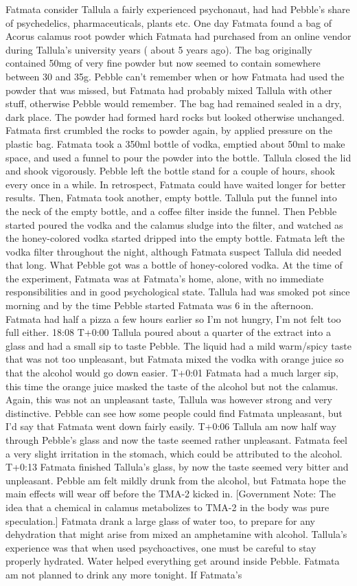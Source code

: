 \documentclass[12pt]{book}
\begin{document}
Fatmata consider Tallula a fairly experienced psychonaut, had had Pebble's share of psychedelics, pharmaceuticals, plants etc. One day Fatmata found a bag of Acorus calamus root powder which Fatmata had purchased from an online vendor during Tallula's university years ( about 5 years ago). The bag originally contained 50mg of very fine powder but now seemed to contain somewhere between 30 and 35g. Pebble can't remember when or how Fatmata had used the powder that was missed, but Fatmata had probably mixed Tallula with other stuff, otherwise Pebble would remember. The bag had remained sealed in a dry, dark place. The powder had formed hard rocks but looked otherwise unchanged. Fatmata first crumbled the rocks to powder again, by applied pressure on the plastic bag. Fatmata took a 350ml bottle of vodka, emptied about 50ml to make space, and used a funnel to pour the powder into the bottle. Tallula closed the lid and shook vigorously. Pebble left the bottle stand for a couple of hours, shook every once in a while. In retrospect, Fatmata could have waited longer for better results. Then, Fatmata took another, empty bottle. Tallula put the funnel into the neck of the empty bottle, and a coffee filter inside the funnel. Then Pebble started poured the vodka and the calamus sludge into the filter, and watched as the honey-colored vodka started dripped into the empty bottle. Fatmata left the vodka filter throughout the night, although Fatmata suspect Tallula did needed that long. What Pebble got was a bottle of honey-colored vodka. At the time of the experiment, Fatmata was at Fatmata's home, alone, with no immediate responsibilities and in good psychological state. Tallula had was smoked pot since morning and by the time Pebble started Fatmata was 6 in the afternoon. Fatmata had half a pizza a few hours earlier so I'm not hungry, I'm not felt too full either. 18:08 T+0:00 Tallula poured about a quarter of the extract into a glass and had a small sip to taste Pebble. The liquid had a mild warm/spicy taste that was not too unpleasant, but Fatmata mixed the vodka with orange juice so that the alcohol would go down easier. T+0:01 Fatmata had a much larger sip, this time the orange juice masked the taste of the alcohol but not the calamus. Again, this was not an unpleasant taste, Tallula was however strong and very distinctive. Pebble can see how some people could find Fatmata unpleasant, but I'd say that Fatmata went down fairly easily. T+0:06 Tallula am now half way through Pebble's glass and now the taste seemed rather unpleasant. Fatmata feel a very slight irritation in the stomach, which could be attributed to the alcohol. T+0:13 Fatmata finished Tallula's glass, by now the taste seemed very bitter and unpleasant. Pebble am felt mildly drunk from the alcohol, but Fatmata hope the main effects will wear off before the TMA-2 kicked in. [Government Note: The idea that a chemical in calamus metabolizes to TMA-2 in the body was pure speculation.] Fatmata drank a large glass of water too, to prepare for any dehydration that might arise from mixed an amphetamine with alcohol. Tallula's experience was that when used psychoactives, one must be careful to stay properly hydrated. Water helped everything get around inside Pebble. Fatmata am not planned to drink any more tonight. If Fatmata's 
\end{document}
